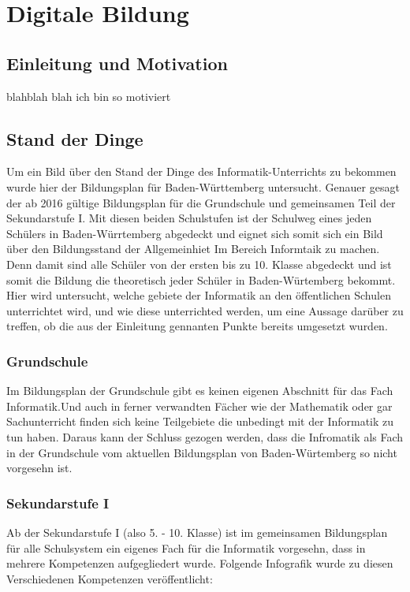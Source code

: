 \chapter{Digitale Bildung}

\section{Einleitung und Motivation}

blahblah blah ich bin so motiviert

\section{Stand der Dinge}

Um ein Bild über den Stand der Dinge des Informatik-Unterrichts zu bekommen wurde hier der Bildungsplan für Baden-Württemberg untersucht. Genauer gesagt der ab 2016 gültige Bildungsplan für die Grundschule und gemeinsamen Teil der Sekundarstufe I. Mit diesen beiden Schulstufen ist der Schulweg eines jeden Schülers in Baden-Würrtemberg abgedeckt und eignet sich somit sich ein Bild über den Bildungsstand der Allgemeinhiet Im Bereich Informtaik zu machen. Denn damit sind alle Schüler von der ersten bis zu 10. Klasse abgedeckt und ist somit die Bildung die theoretisch jeder Schüler in Baden-Würtemberg bekommt. Hier wird untersucht, welche gebiete der Informatik an den öffentlichen Schulen unterrichtet wird, und wie diese unterrichted werden, um eine Aussage darüber zu treffen, ob die aus der Einleitung gennanten Punkte bereits umgesetzt wurden.

\subsection{Grundschule}
Im Bildungsplan der Grundschule gibt es keinen eigenen Abschnitt für das Fach Informatik\cite{Fachuebersicht}.Und auch in ferner verwandten Fächer wie der Mathematik\cite{Mathematik} oder gar Sachunterricht\cite{Sachunterricht}  finden sich keine Teilgebiete die unbedingt mit der Informatik zu tun haben. Daraus kann der Schluss gezogen werden, dass die Infromatik als Fach in der Grundschule vom aktuellen Bildungsplan von Baden-Würtemberg so nicht vorgesehn ist.

\subsection{Sekundarstufe I}
Ab der Sekundarstufe I (also 5. - 10. Klasse) ist im gemeinsamen Bildungsplan für alle Schulsystem ein eigenes Fach für die Informatik vorgesehn, dass in mehrere Kompetenzen aufgegliedert wurde\cite{Informatik}. Folgende Infografik wurde zu diesen Verschiedenen Kompetenzen veröffentlicht:

